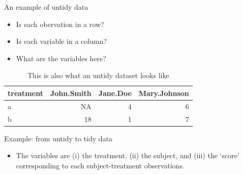 \documentclass[10pt,ignorenonframetext,]{beamer}
\newenvironment{Shaded}{\begin{snugshade}}{\end{snugshade}}
\newcommand{\DataTypeTok}[1]{\textcolor[rgb]{0.13,0.29,0.53}{#1}}
\newcommand{\KeywordTok}[1]{\textcolor[rgb]{0.13,0.29,0.53}{\textbf{#1}}}
\newcommand{\NormalTok}[1]{#1}
\newcommand{\OperatorTok}[1]{\textcolor[rgb]{0.81,0.36,0.00}{\textbf{#1}}}
\newcommand{\OtherTok}[1]{\textcolor[rgb]{0.56,0.35,0.01}{#1}}
\newcommand{\StringTok}[1]{\textcolor[rgb]{0.31,0.60,0.02}{#1}}
\providecommand{\tightlist}{%
  \setlength{\itemsep}{0pt}\setlength{\parskip}{0pt}}
\begin{document}
\begin{frame}{An example of untidy data}
\protect\hypertarget{an-example-of-untidy-data}{}

\begin{itemize}
\item
  Is each obervation in a row?
\item
  Is each variable in a column?
\item
  What are the variables here?
\end{itemize}

\begin{table}

\caption{\label{tab:unnamed-chunk-2}This is also what an untidy dataset looks like}
\centering
\begin{tabular}[t]{lrrr}
\toprule
treatment & John.Smith & Jane.Doe & Mary.Johnson\\
\midrule
\rowcolor{gray!6}  a & NA & 4 & 6\\
b & 18 & 1 & 7\\
\bottomrule
\end{tabular}
\end{table}

\end{frame}

\begin{frame}[fragile]{Example: from untidy to tidy data}
\protect\hypertarget{example-from-untidy-to-tidy-data}{}

\begin{itemize}
\tightlist
\item
  The variables are (i) the treatment, (ii) the subject, and (iii) the
  `score' corresponding to each subject-treatment observations.
\end{itemize}

\begin{Shaded}
\end{Shaded}

\end{frame}
\end{document}
